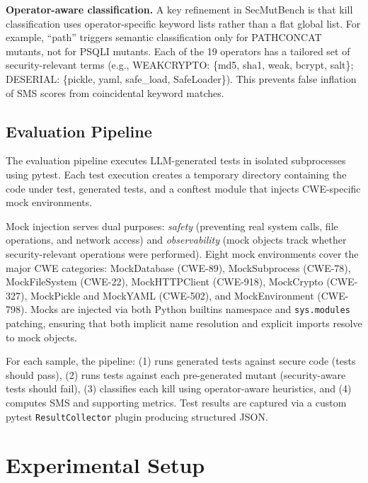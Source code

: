 \documentclass[sigconf,review,anonymous]{acmart}
\begin{document}
\textbf{Operator-aware classification.} A key refinement in SecMutBench is that kill classification uses operator-specific keyword lists rather than a flat global list. For example, ``path'' triggers semantic classification only for \textsc{PATHCONCAT} mutants, not for \textsc{PSQLI} mutants. Each of the 19 operators has a tailored set of security-relevant terms (e.g., \textsc{WEAKCRYPTO}: \{md5, sha1, weak, bcrypt, salt\}; \textsc{DESERIAL}: \{pickle, yaml, safe\_load, SafeLoader\}). This prevents false inflation of SMS scores from coincidental keyword matches.


\subsection{Evaluation Pipeline}

The evaluation pipeline executes LLM-generated tests in isolated subprocesses using pytest. Each test execution creates a temporary directory containing the code under test, generated tests, and a conftest module that injects CWE-specific mock environments.

Mock injection serves dual purposes: \emph{safety} (preventing real system calls, file operations, and network access) and \emph{observability} (mock objects track whether security-relevant operations were performed). Eight mock environments cover the major CWE categories: MockDatabase (CWE-89), MockSubprocess (CWE-78), MockFileSystem (CWE-22), MockHTTPClient (CWE-918), MockCrypto (CWE-327), MockPickle and MockYAML (CWE-502), and MockEnvironment (CWE-798). Mocks are injected via both Python builtins namespace and \texttt{sys.modules} patching, ensuring that both implicit name resolution and explicit imports resolve to mock objects.

For each sample, the pipeline: (1) runs generated tests against secure code (tests should pass), (2) runs tests against each pre-generated mutant (security-aware tests should fail), (3) classifies each kill using operator-aware heuristics, and (4) computes SMS and supporting metrics. Test results are captured via a custom pytest \texttt{ResultCollector} plugin producing structured JSON.


\section{Experimental Setup}\label{sec:setup}
\end{document}
